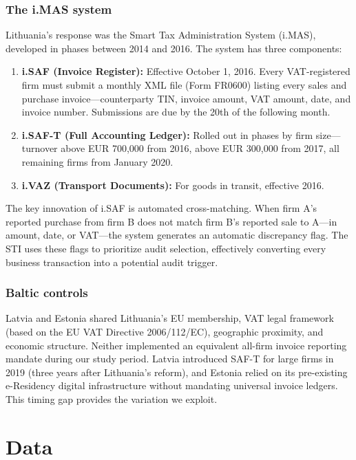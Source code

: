 \documentclass[12pt]{article}
\begin{document}
\subsubsection*{The i.MAS system} Lithuania's response was the Smart Tax Administration System (i.MAS), developed in phases between 2014 and 2016. The system has three components:

\begin{enumerate}
\item \textbf{i.SAF (Invoice Register):} Effective October 1, 2016. Every VAT-registered firm must submit a monthly XML file (Form FR0600) listing every sales and purchase invoice---counterparty TIN, invoice amount, VAT amount, date, and invoice number. Submissions are due by the 20th of the following month.

\item \textbf{i.SAF-T (Full Accounting Ledger):} Rolled out in phases by firm size---turnover above EUR 700,000 from 2016, above EUR 300,000 from 2017, all remaining firms from January 2020.

\item \textbf{i.VAZ (Transport Documents):} For goods in transit, effective 2016.
\end{enumerate}

The key innovation of i.SAF is automated cross-matching. When firm A's reported purchase from firm B does not match firm B's reported sale to A---in amount, date, or VAT---the system generates an automatic discrepancy flag. The STI uses these flags to prioritize audit selection, effectively converting every business transaction into a potential audit trigger.

\subsubsection*{Baltic controls} Latvia and Estonia shared Lithuania's EU membership, VAT legal framework (based on the EU VAT Directive 2006/112/EC), geographic proximity, and economic structure. Neither implemented an equivalent all-firm invoice reporting mandate during our study period. Latvia introduced SAF-T for large firms in 2019 (three years after Lithuania's reform), and Estonia relied on its pre-existing e-Residency digital infrastructure without mandating universal invoice ledgers. This timing gap provides the variation we exploit.

\section{Data}
\end{document}
